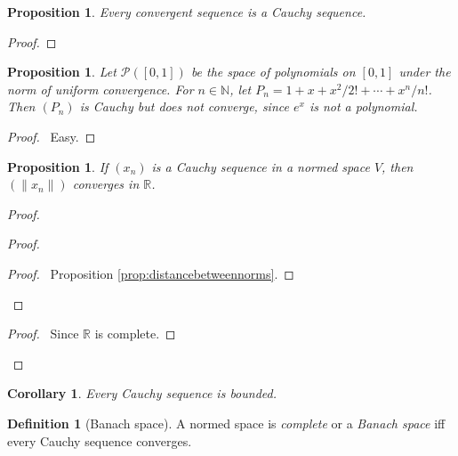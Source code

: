 \documentclass{book}
\let\qed\relax
\newtheorem{prop}[ax]{Proposition}
\newtheorem{cor}{Corollary}[ax]
\theoremstyle{definition}
\newtheorem{df}[ax]{Definition}
\begin{document}
\begin{prop}
Every convergent sequence is a Cauchy sequence.
\end{prop}

\begin{proof}
\pf
{}
\qed
\end{proof}

\begin{prop}
Let $\mathcal{P}([0,1])$ be the space of polynomials on $[0,1]$ under the norm of uniform convergence. For $n \in \mathbb{N}$, let $P_n = 1 + x + x^2 / 2! + \cdots + x^n / n!$. Then $(P_n)$ is Cauchy but does not converge, since $e^x$ is not a polynomial.
\end{prop}

\begin{proof}
\pf\ Easy. \qed
\end{proof}

\begin{prop}
If $(x_n)$ is a Cauchy sequence in a normed space $V$, then $(\| x_n \|)$ converges in $\mathbb{R}$.
\end{prop}

\begin{proof}
\pf
{}
\begin{proof}
	\begin{proof}
		\pf\ Proposition \ref{prop:distancebetweennorms}.
	\end{proof}
\end{proof}
\qedstep
\begin{proof}
	\pf\ Since $\mathbb{R}$ is complete.
\end{proof}
\qed
\end{proof}

\begin{cor}
Every Cauchy sequence is bounded.
\end{cor}

\begin{df}[Banach space]
A normed space is \emph{complete} or a \emph{Banach space} iff every Cauchy sequence converges.
\end{df}
\end{document}
